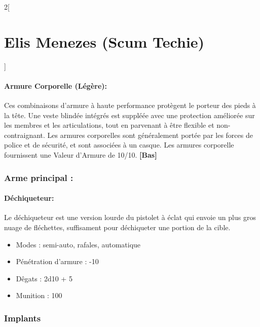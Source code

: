 \documentclass[a4paper,9pt]{article}
\begin{document}
\begin{multicols}{2}[\section*{Elis Menezes (Scum Techie)}]
   \paragraph{Armure Corporelle (Légère):} Ces combinaisons d'armure à haute
   performance protègent le porteur des pieds à la tête. Une veste blindée
   intégrés est suppléée avec une protection améliorée sur les membres et les
   articulations, tout en parvenant à être flexible et non-contraignant. Les
   armures corporelles sont généralement portée par les forces de police et de
   sécurité, et sont associées à un casque. Les armures corporelle fournissent
   une Valeur d'Armure de 10/10. \textbf{[Bas]} 

   \subsubsection*{Arme principal :}

   \paragraph{Déchiqueteur:} Le déchiqueteur est une version lourde du pistolet
   à éclat qui envoie un plus gros nuage de fléchettes, suffisament pour
   déchiqueter une portion de la cible.

   \begin{itemize}
      \item Modes : semi-auto, rafales, automatique
      \item Pénétration d'armure : -10
      \item Dêgats : 2d10 + 5
      \item Munition : 100
   \end{itemize}

   \subsubsection*{Implants}


\end{multicols}
\end{document}
